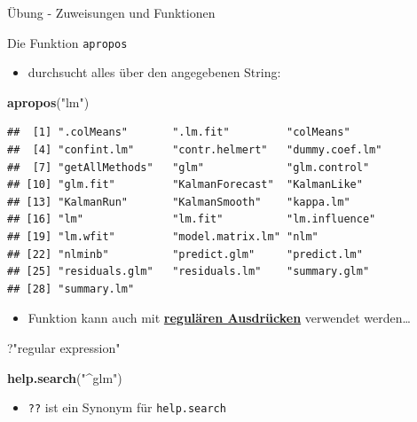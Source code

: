 \documentclass[ignorenonframetext,]{beamer}
\newenvironment{Shaded}{\begin{snugshade}}{\end{snugshade}}
\newcommand{\KeywordTok}[1]{\textcolor[rgb]{0.26,0.66,0.93}{\textbf{#1}}}
\newcommand{\NormalTok}[1]{\textcolor[rgb]{0.74,0.68,0.62}{#1}}
\newcommand{\StringTok}[1]{\textcolor[rgb]{0.02,0.61,0.04}{#1}}
\providecommand{\tightlist}{%
  \setlength{\itemsep}{0pt}\setlength{\parskip}{0pt}}
\begin{document}
\begin{frame}[fragile]{Übung - Zuweisungen und Funktionen}
\begin{frame}[fragile]{Die Funktion \texttt{apropos}}
\begin{itemize}
\tightlist
\item
  durchsucht alles über den angegebenen String:
\end{itemize}

\begin{Shaded}
\begin{Highlighting}[]
\KeywordTok{apropos}\NormalTok{(}\StringTok{"lm"}\NormalTok{)}
\end{Highlighting}
\end{Shaded}

\begin{verbatim}
##  [1] ".colMeans"       ".lm.fit"         "colMeans"       
##  [4] "confint.lm"      "contr.helmert"   "dummy.coef.lm"  
##  [7] "getAllMethods"   "glm"             "glm.control"    
## [10] "glm.fit"         "KalmanForecast"  "KalmanLike"     
## [13] "KalmanRun"       "KalmanSmooth"    "kappa.lm"       
## [16] "lm"              "lm.fit"          "lm.influence"   
## [19] "lm.wfit"         "model.matrix.lm" "nlm"            
## [22] "nlminb"          "predict.glm"     "predict.lm"     
## [25] "residuals.glm"   "residuals.lm"    "summary.glm"    
## [28] "summary.lm"
\end{verbatim}

\begin{itemize}
\tightlist
\item
  Funktion kann auch mit
  \href{https://de.wikipedia.org/wiki/Regul\%C3\%A4rer_Ausdruck}{\textbf{regulären
  Ausdrücken}} verwendet werden\ldots{}
\end{itemize}

\begin{Shaded}
\begin{Highlighting}[]
\NormalTok{?}\StringTok{"regular expression"}
\end{Highlighting}
\end{Shaded}

\begin{Shaded}
\begin{Highlighting}[]
\KeywordTok{help.search}\NormalTok{(}\StringTok{"^glm"}\NormalTok{)}
\end{Highlighting}
\end{Shaded}

\begin{itemize}
\tightlist
\item
  \texttt{??} ist ein Synonym für \texttt{help.search}
\end{itemize}

\end{frame}


\end{frame}
\end{document}
